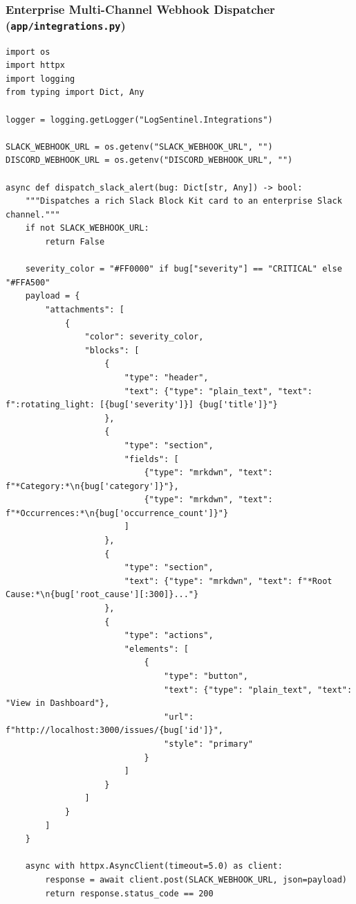 \documentclass[12pt,a4paper]{article}
\begin{document}
\subsubsection{Enterprise Multi-Channel Webhook Dispatcher (\texttt{app/integrations.py})}
\begin{lstlisting}[style=pystyle, caption={Asynchronous Webhook Integrations for Slack, Discord, and Jira}]
import os
import httpx
import logging
from typing import Dict, Any

logger = logging.getLogger("LogSentinel.Integrations")

SLACK_WEBHOOK_URL = os.getenv("SLACK_WEBHOOK_URL", "")
DISCORD_WEBHOOK_URL = os.getenv("DISCORD_WEBHOOK_URL", "")

async def dispatch_slack_alert(bug: Dict[str, Any]) -> bool:
    """Dispatches a rich Slack Block Kit card to an enterprise Slack channel."""
    if not SLACK_WEBHOOK_URL:
        return False

    severity_color = "#FF0000" if bug["severity"] == "CRITICAL" else "#FFA500"
    payload = {
        "attachments": [
            {
                "color": severity_color,
                "blocks": [
                    {
                        "type": "header",
                        "text": {"type": "plain_text", "text": f":rotating_light: [{bug['severity']}] {bug['title']}"}
                    },
                    {
                        "type": "section",
                        "fields": [
                            {"type": "mrkdwn", "text": f"*Category:*\n{bug['category']}"},
                            {"type": "mrkdwn", "text": f"*Occurrences:*\n{bug['occurrence_count']}"}
                        ]
                    },
                    {
                        "type": "section",
                        "text": {"type": "mrkdwn", "text": f"*Root Cause:*\n{bug['root_cause'][:300]}..."}
                    },
                    {
                        "type": "actions",
                        "elements": [
                            {
                                "type": "button",
                                "text": {"type": "plain_text", "text": "View in Dashboard"},
                                "url": f"http://localhost:3000/issues/{bug['id']}",
                                "style": "primary"
                            }
                        ]
                    }
                ]
            }
        ]
    }

    async with httpx.AsyncClient(timeout=5.0) as client:
        response = await client.post(SLACK_WEBHOOK_URL, json=payload)
        return response.status_code == 200


\end{lstlisting}
\end{document}
